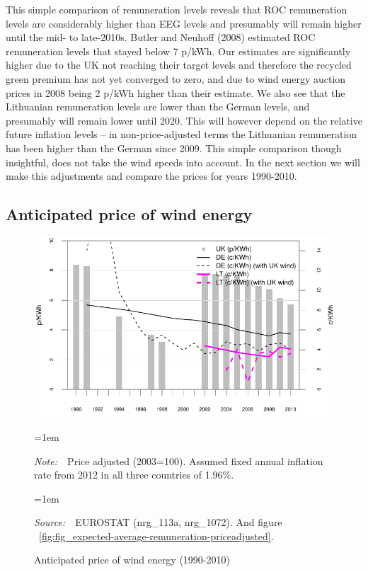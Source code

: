 \documentclass[a4paper, 12pt]{article}
\newcommand{\Figtext}[1]{%
	\begin{tablenotes}[para,flushleft]
		\hangindent=1em
		\footnotesize
		\raggedright
		#1
	\end{tablenotes}
}
\newcommand{\Fignote}[1]{\Figtext{\emph{Note:~}~#1}}
\newcommand{\Figsource}[1]{\Figtext{\emph{Source:~}~#1}}
\begin{document}
This simple comparison of remuneration levels reveals that ROC remuneration levels are considerably higher than EEG levels and presumably will remain higher until the mid- to late-2010s. Butler and Neuhoff (2008) estimated ROC remuneration levels that stayed below 7 p/kWh. Our estimates are significantly higher due to the UK not reaching their target levels and therefore the recycled green premium has not yet converged to zero, and due to wind energy auction prices in 2008 being 2 p/kWh higher than their estimate. We also see that the Lithuanian remuneration levels are lower than the German levels, and presumably will remain lower until 2020. This will however depend on the relative future inflation levels – in non-price-adjusted terms the Lithuanian remuneration has been higher than the German since 2009. This simple comparison though insightful, does not take the wind speeds into account. In the next section we will make this adjustments and compare the prices for years 1990-2010.

\subsection{Anticipated price of wind energy}

\begin{figure}
	\centering
	\caption{Anticipated price of wind energy (1990-2010)}
	\includegraphics[width=1\textwidth]{fig_anticipated-price-energy}
	\Fignote{Price adjusted (2003=100). Assumed fixed annual inflation rate from 2012 in all three countries of 1.96\%.}
	\Figsource{EUROSTAT (nrg\_113a, nrg\_1072). And figure ~\ref{fig:fig_expected-average-remuneration-priceadjusted}.}
	\label{fig:fig_anticipated-price-energy}
\end{figure}
\end{document}
